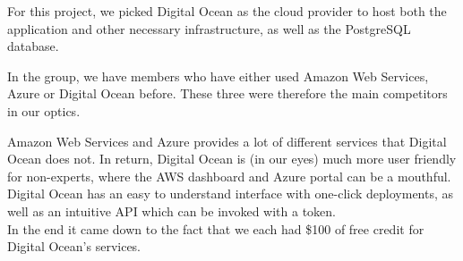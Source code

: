 For this project, we picked Digital Ocean as the cloud provider to host both the application and other necessary infrastructure, as well as the PostgreSQL database. 

In the group, we have members who have either used Amazon Web Services, Azure or Digital Ocean before. These three were therefore the main competitors in our optics.

Amazon Web Services and Azure provides a lot of different services that Digital Ocean does not. In return, Digital Ocean is (in our eyes) much more user friendly for non-experts, where the AWS dashboard and Azure portal can be a mouthful. Digital Ocean has an easy to understand interface with one-click deployments, as well as an intuitive API which can be invoked with a token. \\

\noindent In the end it came down to the fact that we each had \$100 of free credit for Digital Ocean's services.